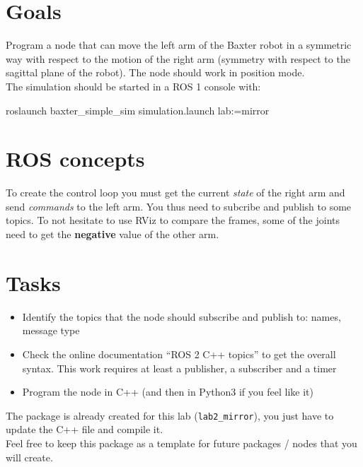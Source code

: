 \documentclass{ecnreport}
\author{O. Kermorgant}
\begin{document}


\section{Goals}

Program a node that can move the left arm of the Baxter robot in a symmetric way with respect to
the motion of the right arm (symmetry with respect to the sagittal plane of the robot).
The node should work in position mode. \\

The simulation should be started in a ROS 1 console with:
\begin{bashcodelarge}
 roslaunch baxter_simple_sim simulation.launch lab:=mirror
\end{bashcodelarge}


\section{ROS concepts}

To create the control loop you must get the current \emph{state} of the right arm and send \emph{commands} to 
the left arm. You thus need to subcribe and publish to some topics. To not hesitate to use RViz to compare the frames, some of the joints need to get the \textbf{negative}
value of the other arm.

\section{Tasks}

\begin{itemize}
\item Identify the topics that the node should subscribe and publish to: names, message type
\item Check the online documentation ``ROS 2 C++ topics'' to get the overall syntax. This work requires at least a publisher, a subscriber and a timer
\item Program the node in C++ (and then in Python3 if you feel like it)
\end{itemize}

The package is already created for this lab (\texttt{lab2\_mirror}), you just have to update the C++ file and compile it.\\
Feel free to keep this package as a template for future packages / nodes that you will create.
\end{document}
